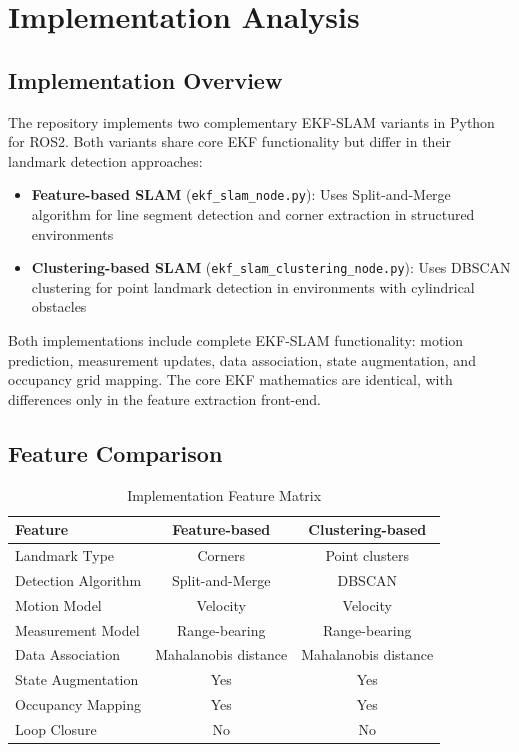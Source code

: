\documentclass[12pt,a4paper]{article}
\begin{document}
\section{Implementation Analysis}

\subsection{Implementation Overview}

The repository implements two complementary EKF-SLAM variants in Python for ROS2. Both variants share core EKF functionality but differ in their landmark detection approaches:

\begin{itemize}
    \item \textbf{Feature-based SLAM} (\texttt{ekf\_slam\_node.py}): Uses Split-and-Merge algorithm for line segment detection and corner extraction in structured environments
    \item \textbf{Clustering-based SLAM} (\texttt{ekf\_slam\_clustering\_node.py}): Uses DBSCAN clustering for point landmark detection in environments with cylindrical obstacles
\end{itemize}

Both implementations include complete EKF-SLAM functionality: motion prediction, measurement updates, data association, state augmentation, and occupancy grid mapping. The core EKF mathematics are identical, with differences only in the feature extraction front-end.

\subsection{Feature Comparison}

\begin{table}[H]
\centering
\caption{Implementation Feature Matrix}
\begin{tabular}{@{}lcc@{}}
\toprule
\textbf{Feature} & \textbf{Feature-based} & \textbf{Clustering-based} \\
\midrule
Landmark Type & Corners & Point clusters \\
Detection Algorithm & Split-and-Merge & DBSCAN \\
Motion Model & Velocity & Velocity \\
Measurement Model & Range-bearing & Range-bearing \\
Data Association & Mahalanobis distance & Mahalanobis distance \\
State Augmentation & Yes & Yes \\
Occupancy Mapping & Yes & Yes \\
Loop Closure & No & No \\
\bottomrule
\end{tabular}
\end{table}
\end{document}
